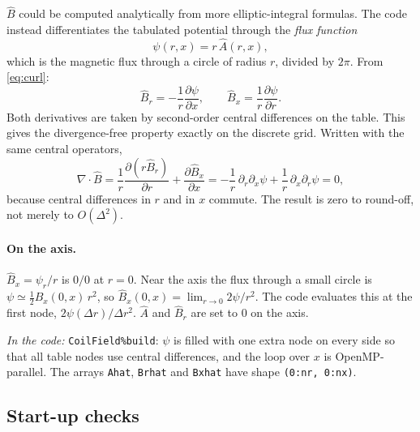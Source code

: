 \documentclass[11pt,a4paper]{article}
\newcommand{\Ahat}{\hat{A}}
\newcommand{\Bhat}{\hat{B}}
\newcommand{\code}[1]{\texttt{#1}}
\newcommand{\incode}[1]{\par\smallskip\noindent\textit{In the code:} #1\par\smallskip}
\begin{document}
$\Bhat$ could be computed analytically from more elliptic-integral
formulas. The code instead differentiates the tabulated potential through
the \emph{flux function}
\begin{equation}
  \psi(r,x) = r\,\Ahat(r,x),
\end{equation}
which is the magnetic flux through a circle of radius $r$, divided by
$2\pi$. From \eqref{eq:curl}:
\begin{equation}
  \Bhat_r = -\frac{1}{r}\frac{\partial\psi}{\partial x},\qquad
  \Bhat_x =  \frac{1}{r}\frac{\partial\psi}{\partial r}.
  \label{eq:Bpsi}
\end{equation}
Both derivatives are taken by second-order central differences on the
table. This gives the divergence-free property exactly on the discrete
grid. Written with the same central operators,
\begin{equation}
  \nabla\cdot\Bhat = \frac{1}{r}\frac{\partial(r\Bhat_r)}{\partial r}
                   + \frac{\partial\Bhat_x}{\partial x}
  = -\frac{1}{r}\,\partial_r\partial_x\psi + \frac{1}{r}\,\partial_x\partial_r\psi = 0,
\end{equation}
because central differences in $r$ and in $x$ commute. The result is zero
to round-off, not merely to $O(\Delta^2)$.

\paragraph{On the axis.} $\Bhat_x = \psi_r/r$ is $0/0$ at $r=0$. Near the
axis the flux through a small circle is $\psi \simeq \tfrac12\Bhat_x(0,x)\,r^2$,
so $\Bhat_x(0,x) = \lim_{r\to0}2\psi/r^2$. The code evaluates this at the
first node, $2\psi(\Delta r)/\Delta r^2$. $\Ahat$ and $\Bhat_r$ are set to
0 on the axis.

\incode{\code{CoilField\%build}: $\psi$ is filled with one extra node on
every side so that all table nodes use central differences, and the loop
over $x$ is OpenMP-parallel. The arrays \code{Ahat}, \code{Brhat} and
\code{Bxhat} have shape \code{(0:nr, 0:nx)}.}

\subsection{Start-up checks}
\end{document}
